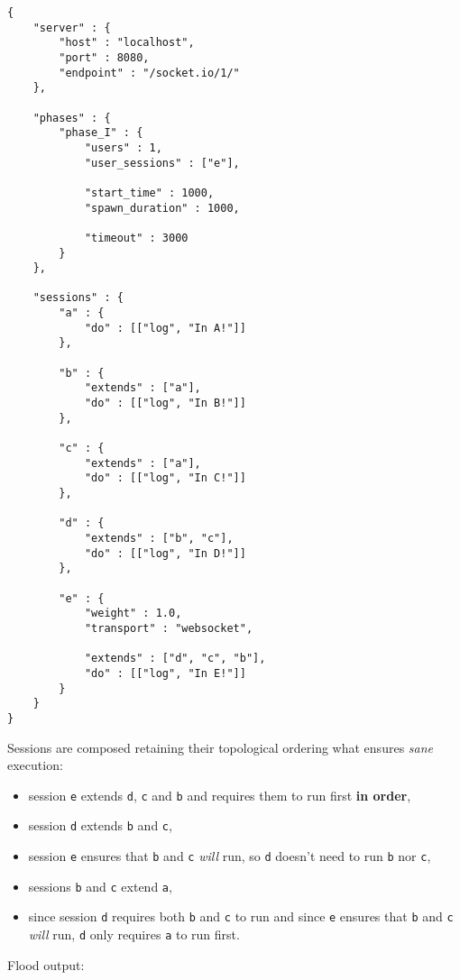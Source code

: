 \documentclass[a4paper]{article}
\begin{document}
\begin{verbatim}
{
    "server" : {
        "host" : "localhost",
        "port" : 8080,
        "endpoint" : "/socket.io/1/"
    },

    "phases" : {
        "phase_I" : {
            "users" : 1,
            "user_sessions" : ["e"],

            "start_time" : 1000,
            "spawn_duration" : 1000,

            "timeout" : 3000
        }
    },

    "sessions" : {
        "a" : {
            "do" : [["log", "In A!"]]
        },

        "b" : {
            "extends" : ["a"],
            "do" : [["log", "In B!"]]
        },

        "c" : {
            "extends" : ["a"],
            "do" : [["log", "In C!"]]
        },

        "d" : {
            "extends" : ["b", "c"],
            "do" : [["log", "In D!"]]
        },

        "e" : {
            "weight" : 1.0,
            "transport" : "websocket",

            "extends" : ["d", "c", "b"],
            "do" : [["log", "In E!"]]
        }
    }
}
\end{verbatim}




\noindent
Sessions are composed retaining their topological ordering what ensures \emph{sane} execution:

\begin{itemize}
\item session \texttt{e} extends \texttt{d}, \texttt{c} and \texttt{b} and requires them to run first \textbf{in order},
\item session \texttt{d} extends \texttt{b} and \texttt{c},
\item session \texttt{e} ensures that \texttt{b} and \texttt{c} \emph{will} run, so \texttt{d} doesn't need to run \texttt{b} nor \texttt{c},
\item sessions \texttt{b} and \texttt{c} extend \texttt{a},
\item since session \texttt{d} requires both \texttt{b} and \texttt{c} to run and since \texttt{e} ensures that \texttt{b} and \texttt{c} \emph{will} run, \texttt{d} only requires \texttt{a} to run first.
\end{itemize}

\noindent
Flood output:
\end{document}
